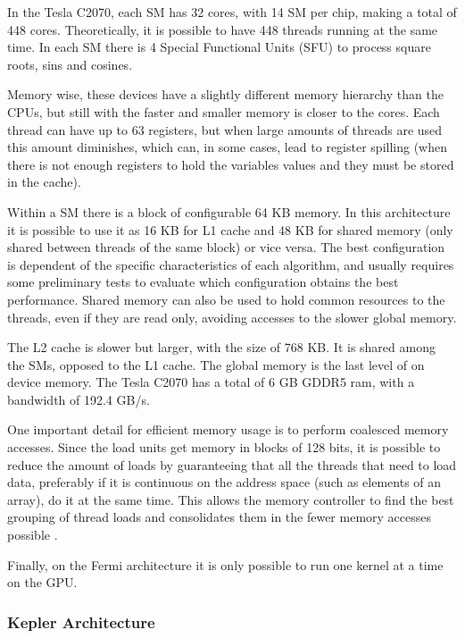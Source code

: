 In the Tesla C2070, each SM has 32 \cuda cores, with 14 SM per chip, making a total of 448 \cuda cores. Theoretically, it is possible to have 448 \cuda threads running at the same time. In each SM there is 4 Special Functional Units (SFU) to process square roots, sins and cosines.

Memory wise, these devices have a slightly different memory hierarchy than the CPUs, but still with the faster and smaller memory is closer to the \cuda cores. Each \cuda thread can have up to 63 registers, but when large amounts of threads are used this amount diminishes, which can, in some cases, lead to register spilling (when there is not enough registers to hold the variables values and they must be stored in the cache).

Within a SM there is a block of configurable 64 KB memory. In this architecture it is possible to use it as 16 KB for L1 cache and 48 KB for shared memory (only shared between threads of the same block) or vice versa. The best configuration is dependent of the specific characteristics of each algorithm, and usually requires some preliminary tests to evaluate which configuration obtains the best performance. Shared memory can also be used to hold common resources to the threads, even if they are read only, avoiding accesses to the slower global memory.

The L2 cache is slower but larger, with the size of 768 KB. It is shared among the SMs, opposed to the L1 cache. The global memory is the last level of on device memory. The Tesla C2070 has a total of 6 GB GDDR5 ram, with a bandwidth of 192.4 GB/s.

One important detail for efficient memory usage is to perform coalesced memory accesses. Since the load units get memory in blocks of 128 bits, it is possible to reduce the amount of loads by guaranteeing that all the threads that need to load data, preferably if it is continuous on the address space (such as elements of an array), do it at the same time. This allows the memory controller to find the best grouping of thread loads and consolidates them in the fewer memory accesses possible \cite{NVIDIA:Fermi}.

Finally, on the Fermi architecture it is only possible to run one kernel at a time on the GPU.

\subsubsection{\nvidia Kepler Architecture}


